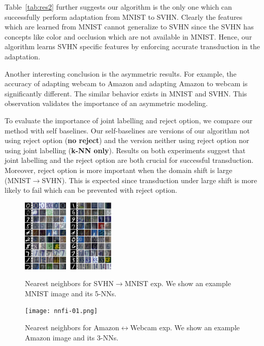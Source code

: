 Table~\ref{tab:res2} further suggests our algorithm is the only one which can successfully perform adaptation from MNIST to SVHN. Clearly the features which are learned from MNIST cannot generalize to SVHN since the SVHN has concepts like color and occlusion which are not available in MNIST. Hence, our algorithm learns SVHN specific features by enforcing accurate transduction in the adaptation.

Another interesting conclusion is the asymmetric results. For example, the accuracy of adapting webcam to Amazon and adapting Amazon to webcam is significantly different. The similar behavior exists in MNIST and SVHN. This observation validates the importance of an asymmetric modeling.

To evaluate the importance of joint labelling and reject option, we compare our method with self baselines. Our self-baselines are versions of our algorithm not using reject option (\textbf{no reject}) and the version neither using reject option nor using joint labelling (\textbf{k-NN only}). Results on both experiments suggest that joint labelling and the reject option are both crucial for successful transduction. Moreover, reject option is more important when the domain shift is large (\eg MNIST$\rightarrow$SVHN). This is expected since transduction under large  shift is more likely to fail which can be prevented with reject option.

\begin{figure}
\small
\begin{small}
\includegraphics[width=0.4\textwidth]{nndig}
\vspace{-5mm}
\caption{Nearest neighbors for SVHN$\rightarrow$MNIST exp. We show an example MNIST image and its 5-NNs.}
\label{fig:nn}
\texttt{[image: nnfi-01.png]}
\caption{Nearest neighbors for Amazon$\leftrightarrow$Webcam exp. We show an example Amazon image and its 3-NNs. }
\label{fig:nnoffice}
\end{small}
\vspace{-5mm}
\end{figure}





